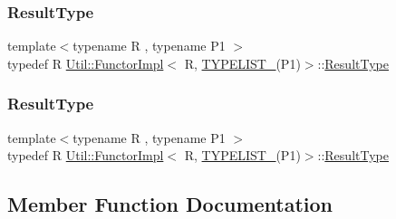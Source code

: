 \subsubsection{\texorpdfstring{ResultType}{ResultType}\hspace{0.1cm}{\footnotesize\ttfamily [2/3]}}
{\footnotesize\ttfamily template$<$typename R , typename P1 $>$ \\
typedef R \mbox{\hyperlink{classUtil_1_1FunctorImpl}{Util\+::\+Functor\+Impl}}$<$ R, \mbox{\hyperlink{adat__devel__install_2include_2adat_2typelist_8h_a6a7a6aa3dece450c8d239713e2952df7}{T\+Y\+P\+E\+L\+I\+S\+T\+\_}}(P1)$>$\+::\mbox{\hyperlink{structUtil_1_1Private_1_1FunctorImplBase_a5e95fd30fdd89f3c5080b68ab5891bc3}{Result\+Type}}}

\mbox{\label{classUtil_1_1FunctorImpl_3_01R_00_01TYPELIST__1_07P1_08_4_a15eeae50d81fe84dfae39ecc200cb08a}} 
\subsubsection{\texorpdfstring{ResultType}{ResultType}\hspace{0.1cm}{\footnotesize\ttfamily [3/3]}}
{\footnotesize\ttfamily template$<$typename R , typename P1 $>$ \\
typedef R \mbox{\hyperlink{classUtil_1_1FunctorImpl}{Util\+::\+Functor\+Impl}}$<$ R, \mbox{\hyperlink{adat__devel__install_2include_2adat_2typelist_8h_a6a7a6aa3dece450c8d239713e2952df7}{T\+Y\+P\+E\+L\+I\+S\+T\+\_}}(P1)$>$\+::\mbox{\hyperlink{structUtil_1_1Private_1_1FunctorImplBase_a5e95fd30fdd89f3c5080b68ab5891bc3}{Result\+Type}}}



\subsection{Member Function Documentation}
\mbox{\label{classUtil_1_1FunctorImpl_3_01R_00_01TYPELIST__1_07P1_08_4_a62c984afa0dca11e0101cfcba2052a8c}} 
